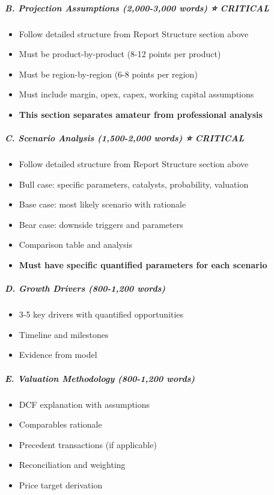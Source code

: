 \documentclass[11pt]{article}
\begin{document}
\subparagraph{B. Projection Assumptions (2,000-3,000 words) ⭐ CRITICAL}\mbox{}\par
\begin{itemize}[leftmargin=*,itemsep=2pt,topsep=2pt]
\item {} Follow detailed structure from Report Structure section above
\item {} Must be product-by-product (8-12 points per product)
\item {} Must be region-by-region (6-8 points per region)
\item {} Must include margin, opex, capex, working capital assumptions
\item {} \textbf{This section separates amateur from professional analysis}
\end{itemize}

\subparagraph{C. Scenario Analysis (1,500-2,000 words) ⭐ CRITICAL}\mbox{}\par
\begin{itemize}[leftmargin=*,itemsep=2pt,topsep=2pt]
\item {} Follow detailed structure from Report Structure section above
\item {} Bull case: specific parameters, catalysts, probability, valuation
\item {} Base case: most likely scenario with rationale
\item {} Bear case: downside triggers and parameters
\item {} Comparison table and analysis
\item {} \textbf{Must have specific quantified parameters for each scenario}
\end{itemize}

\subparagraph{D. Growth Drivers (800-1,200 words)}\mbox{}\par
\begin{itemize}[leftmargin=*,itemsep=2pt,topsep=2pt]
\item {} 3-5 key drivers with quantified opportunities
\item {} Timeline and milestones
\item {} Evidence from model
\end{itemize}

\subparagraph{E. Valuation Methodology (800-1,200 words)}\mbox{}\par
\begin{itemize}[leftmargin=*,itemsep=2pt,topsep=2pt]
\item {} DCF explanation with assumptions
\item {} Comparables rationale
\item {} Precedent transactions (if applicable)
\item {} Reconciliation and weighting
\item {} Price target derivation
\end{itemize}
\end{document}
